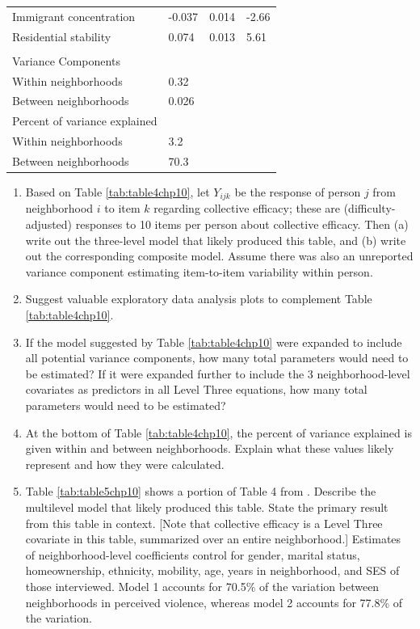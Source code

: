 \documentclass[
]{krantz}
\begin{document}
\begin{table}
{\begin{tabular}[t]{llll}
\hspace{1em}Immigrant concentration & -0.037 & 0.014 & -2.66\\
\hspace{1em}Residential stability & 0.074 & 0.013 & 5.61\\
\addlinespace[0.3em]
\multicolumn{4}{l}{\textbf{Percent of variance explained}}\\
\hspace{1em}Variance Components &  &  & \\
\hspace{1em}Within neighborhoods & 0.32 &  & \\
Between neighborhoods & 0.026 &  & \\
Percent of variance explained &  &  & \\
Within neighborhoods & 3.2 &  & \\
Between neighborhoods & 70.3 &  & \\
\bottomrule
\end{tabular}}
\end{table}

\begin{enumerate}
\def\labelenumi{\arabic{enumi}.}
\setcounter{enumi}{17}
\item
  Based on Table \ref{tab:table4chp10}, let \(Y_{ijk}\) be the response of person \(j\) from neighborhood \(i\) to item \(k\) regarding collective efficacy; these are (difficulty-adjusted) responses to 10 items per person about collective efficacy. Then (a) write out the three-level model that likely produced this table, and (b) write out the corresponding composite model. Assume there was also an unreported variance component estimating item-to-item variability within person.
\item
  Suggest valuable exploratory data analysis plots to complement Table \ref{tab:table4chp10}.
\item
  If the model suggested by Table \ref{tab:table4chp10} were expanded to include all potential variance components, how many total parameters would need to be estimated? If it were expanded further to include the 3 neighborhood-level covariates as predictors in all Level Three equations, how many total parameters would need to be estimated?
\item
  At the bottom of Table \ref{tab:table4chp10}, the percent of variance explained is given within and between neighborhoods. Explain what these values likely represent and how they were calculated.
\item
  Table \ref{tab:table5chp10} shows a portion of Table 4 from \citet{Sampson1997}. Describe the multilevel model that likely produced this table. State the primary result from this table in context. {[}Note that collective efficacy is a Level Three covariate in this table, summarized over an entire neighborhood.{]} Estimates of neighborhood-level coefficients control for gender, marital status, homeownership, ethnicity, mobility, age, years in neighborhood, and SES of those interviewed. Model 1 accounts for 70.5\% of the variation between neighborhoods in perceived violence, whereas model 2 accounts for 77.8\% of the variation.
\end{enumerate}
\end{document}
